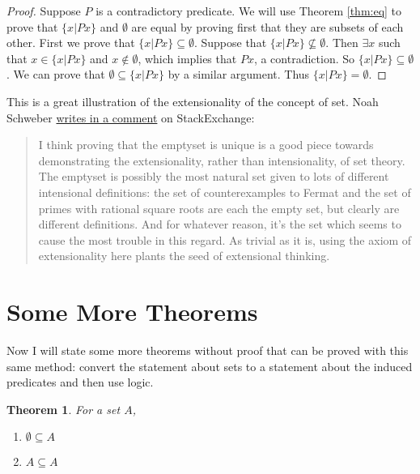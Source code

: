 \documentclass[12pt]{article}
\newcounter{thmc}
\newcounter{exc}
\newtheorem{thm}[thmc]{Theorem}
\begin{document}
\begin{proof}
  Suppose $P$ is a contradictory predicate.  We will use Theorem
  \ref{thm:eq} to prove that $\{x|Px\}$ and $\emptyset$ are equal by
  proving first that they are subsets of each other.  First we prove
  that $\{x|Px\}\subseteq\emptyset$.  Suppose that
  $\{x|Px\}\not\subseteq\emptyset$.  Then $\exists x$ such that
  $x\in\{x|Px\}$ and $x\not\in\emptyset$, which implies that $Px$, a
  contradiction.  So $\{x|Px\}\subseteq\emptyset$.  We can prove that
  $\emptyset\subseteq\{x|Px\}$ by a similar argument.  Thus
  $\{x|Px\}=\emptyset$.
\end{proof}

This is a great illustration of the extensionality of the concept of
set.  Noah Schweber
\href{https://math.stackexchange.com/questions/2296639/is-the-empty-set-or-any-analogy-ever-non-unique#comment4724973_2296639}{writes
  in a comment} on StackExchange:

\begin{quote}

  I think proving that the emptyset is unique is a good piece towards
  demonstrating the extensionality, rather than intensionality, of set
  theory. The emptyset is possibly the most natural set given to lots
  of different intensional definitions: the set of counterexamples to
  Fermat and the set of primes with rational square roots are each the
  empty set, but clearly are different definitions. And for whatever
  reason, it's the set which seems to cause the most trouble in this
  regard. As trivial as it is, using the axiom of extensionality here
  plants the seed of extensional thinking.

\end{quote}

\section{Some More Theorems}

Now I will state some more theorems without proof that can be proved
with this same method: convert the statement about sets to a statement
about the induced predicates and then use logic.

\begin{thm}
  For a set $A$,
  \begin{enumerate}[label=\alph*)]
  \item $\emptyset\subseteq A$
  \item $A\subseteq A$
  \end{enumerate}
\end{thm}
\end{document}
